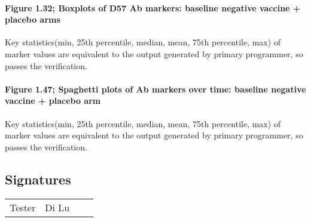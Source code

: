 \documentclass[]{article}
\let\oldparagraph\paragraph
\renewcommand{\paragraph}[1]{\oldparagraph{#1}\mbox{}}
\begin{document}
\paragraph{Figure 1.32; Boxplots of D57 Ab markers: baseline negative
vaccine + placebo
arms}\label{figure-1.32-boxplots-of-d57-ab-markers-baseline-negative-vaccine-placebo-arms}

Key statistics(min, 25th percentile, median, mean, 75th percentile, max)
of marker values are equivalent to the output generated by primary
programmer, so passes the verification.

\paragraph{Figure 1.47; Spaghetti plots of Ab markers over time:
baseline negative vaccine + placebo
arm}\label{figure-1.47-spaghetti-plots-of-ab-markers-over-time-baseline-negative-vaccine-placebo-arm}

Key statistics(min, 25th percentile, median, mean, 75th percentile, max)
of marker values are equivalent to the output generated by primary
programmer, so passes the verification.

\subsection{Signatures}\label{signatures}

\begin{tabular}{|>{\raggedright\arraybackslash}p{9em}|>{\raggedright\arraybackslash}p{11em}|>{\raggedright\arraybackslash}p{15em}|>{\raggedright\arraybackslash}p{8em}|}
\hline
\cellcolor[HTML]{B8CCE4}{Role} & \cellcolor[HTML]{B8CCE4}{Name} & \cellcolor[HTML]{B8CCE4}{Signature} & \cellcolor[HTML]{B8CCE4}{Date}\\
\hline
Tester & Di Lu &  & \\
\hline
\end{tabular}
\end{document}
